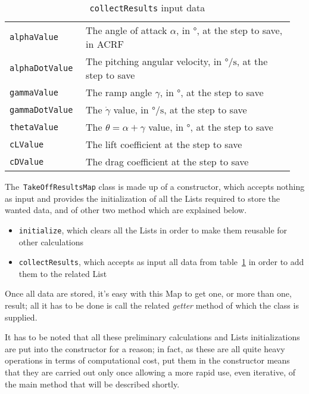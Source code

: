 \begin{table}[!t]
{\begin{tabular}{p{0.25\linewidth}p{0.7\linewidth}}
\lstinline[language=Java]!alphaValue! & The angle of attack $\alpha$, in  $\si{\degree}$, at the step to save, in \gls{ACRF} \\ [0.2cm]
\lstinline[language=Java]!alphaDotValue! & The pitching angular velocity, in  $\si{\degree\per\second}$, at the step to save \\ [0.2cm]
\lstinline[language=Java]!gammaValue! & The ramp angle $\gamma$, in  $\si{\degree}$, at the step to save  \\ [0.2cm]
\lstinline[language=Java]!gammaDotValue! & The $\dot\gamma$ value, in  $\si{\degree\per\second}$, at the step to save \\ [0.2cm]
\lstinline[language=Java]!thetaValue! & The $\theta=\alpha+\gamma$ value, in  $\si{\degree}$, at the step to save \\ [0.2cm]
\lstinline[language=Java]!cLValue! & The lift coefficient at the step to save \\ [0.2cm]
\lstinline[language=Java]!cDValue! & The drag coefficient at the step to save \\ 
\bottomrule
\end{tabular}
}
\caption{\lstinline[language=Java]!collectResults! input data}
\label{table:TakeOffMapInput}
\end{table}

\bigskip
\noindent
The~\lstinline[language=Java]!TakeOffResultsMap! class is made up of a constructor, which accepts nothing as input and provides the initialization of all the \gls{List}s required to store the wanted data, and of other two method which are explained below.
%
\begin{itemize}
\item \lstinline[language=Java]!initialize!, which clears all the \gls{List}s in order to make them reusable for other calculations
\item \lstinline[language=Java]!collectResults!, which accepts as input all data from table~\ref{table:TakeOffMapInput} in order to add them to the related \gls{List}
\end{itemize}
%
Once all data are stored, it's easy with this \gls{Map} to get one, or more than one, result; all it has to be done is call the related \emph{getter} method of which the class is supplied. 

\bigskip
\noindent
It has to be noted that all these preliminary calculations and \gls{List}s initializations are put into the constructor for a reason; in fact, as these are all quite heavy operations in terms of computational cost, put them in the constructor means that they are carried out only once allowing a more rapid use, even iterative, of the main method that will be described shortly.

